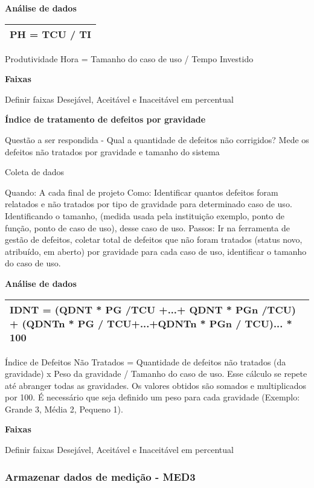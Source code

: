 \textbf{Análise de dados}

\begin{tabular}{|l|}
\hline
PH = TCU / TI \\ 
\hline
\end{tabular}

Produtividade Hora = Tamanho do caso de uso / Tempo Investido

\textbf{Faixas}

Definir faixas Desejável, Aceitável e Inaceitável em percentual

\textbf{Índice de tratamento de defeitos por gravidade}

Questão a ser respondida - Qual a quantidade de defeitos não corrigidos? Mede os defeitos não tratados por gravidade e tamanho do sistema

Coleta de dados

Quando: A cada final de projeto Como: Identificar quantos defeitos foram relatados e não tratados por tipo de gravidade para determinado caso de uso. Identificando o tamanho, (medida usada pela instituição exemplo, ponto de função, ponto de caso de uso), desse caso de uso. Passos: Ir na ferramenta de gestão de defeitos, coletar total de defeitos que não foram tratados (status novo, atribuído, em aberto) por gravidade para cada caso de uso, identificar o tamanho do caso de uso.

\textbf{Análise de dados}

\begin{table}[!ht]
\centering
\begin{tabular}{|p{130mm}|}
\hline
IDNT = (QDNT * PG /TCU +...+ QDNT * PGn /TCU) + (QDNTn * PG / TCU+...+QDNTn * PGn / TCU)... * 100 \\ 
\hline
\end{tabular}
\end{table}

Índice de Defeitos Não Tratados = Quantidade de defeitos não tratados (da gravidade) x Peso da gravidade / Tamanho do caso de uso. Esse cálculo se repete até abranger todas as gravidades. Os valores obtidos são somados e multiplicados por 100. É necessário que seja definido um peso para cada gravidade (Exemplo: Grande 3, Média 2, Pequeno 1).

\textbf{Faixas}

Definir faixas Desejável, Aceitável e Inaceitável em percentual

\subsubsection{Armazenar dados de medição - MED3 }
\label{sec:med3}

